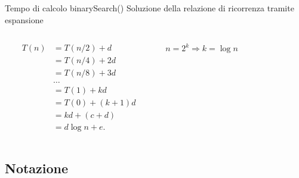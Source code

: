 \begin{frame}{Tempo di calcolo \textsf{binarySearch}()}
Soluzione della relazione di ricorrenza tramite espansione
\begin{columns}[c]
\begin{column}{0.5\textwidth}
\begin{align*}
T(n) 	&= T(n/2) + d\\
		&= T(n/4) + 2d\\
		&= T(n/8) + 3d\\
		& \ldots\\
		&= T(1) + kd\\
		&= T(0) + (k+1)d\\
		&= kd+(c+d) \\
		&= d \log n + e.
\end{align*}
\end{column}
\begin{column}{0.3\textwidth}
\begin{beamerboxesrounded}[shadow=true]{}
\begin{center}
$n = 2^k \Rightarrow k = \log n$
\end{center}
\end{beamerboxesrounded}
\end{column}
\begin{column}{0.2\textwidth}
\end{column}
\end{columns}

\end{frame}

\subsection{Notazione}

